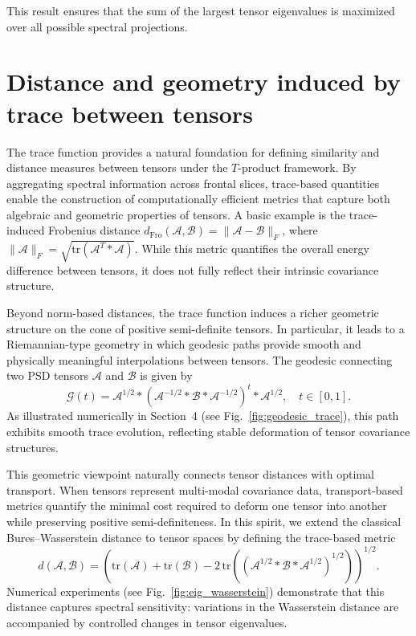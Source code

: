 \documentclass[oupthm]{CUP-JNL-BCM}%
\theoremstyle{oupplain}
\theoremstyle{oupdefinition}
\theoremstyle{oupremark}
\theoremstyle{oupproof}
\numberwithin{equation}{section}
\begin{document}
\noindent This result ensures that the sum of the largest tensor eigenvalues is maximized over all possible spectral projections.

\section{Distance and geometry induced by trace between tensors}\label{distance}

The trace function provides a natural foundation for defining similarity and distance
measures between tensors under the $T$-product framework. By aggregating spectral
information across frontal slices, trace-based quantities enable the construction of
computationally efficient metrics that capture both algebraic and geometric properties
of tensors. A basic example is the trace-induced Frobenius distance
$d_{\mathrm{Fro}}(\mathcal{A},\mathcal{B})=\|\mathcal{A}-\mathcal{B}\|_F$, where
$\|\mathcal{A}\|_F=\sqrt{\mathrm{tr}(\mathcal{A}^T * \mathcal{A})}$. While this metric
quantifies the overall energy difference between tensors, it does not fully reflect
their intrinsic covariance structure.

Beyond norm-based distances, the trace function induces a richer geometric structure
on the cone of positive semi-definite tensors. In particular, it leads to a
Riemannian-type geometry in which geodesic paths provide smooth and physically
meaningful interpolations between tensors. The geodesic connecting two PSD tensors
$\mathcal{A}$ and $\mathcal{B}$ is given by
\[
\mathcal{G}(t)
= \mathcal{A}^{1/2} *
(\mathcal{A}^{-1/2} * \mathcal{B} * \mathcal{A}^{-1/2})^{t}
* \mathcal{A}^{1/2}, \quad t \in [0,1].
\]
As illustrated numerically in Section~4 (see Fig.~\ref{fig:geodesic_trace}),
this path exhibits smooth trace evolution, reflecting stable deformation of tensor
covariance structures.

This geometric viewpoint naturally connects tensor distances with optimal transport.
When tensors represent multi-modal covariance data, transport-based metrics quantify
the minimal cost required to deform one tensor into another while preserving
positive semi-definiteness. In this spirit, we extend the classical Bures--Wasserstein
distance to tensor spaces by defining the trace-based metric
\[
d(\mathcal{A}, \mathcal{B})
=
\left(
\mathrm{tr}(\mathcal{A}) + \mathrm{tr}(\mathcal{B})
- 2\,\mathrm{tr}\!\left(
(\mathcal{A}^{1/2} * \mathcal{B} * \mathcal{A}^{1/2})^{1/2}
\right)
\right)^{1/2}.
\]
Numerical experiments (see Fig.~\ref{fig:eig_wasserstein}) demonstrate that this
distance captures spectral sensitivity: variations in the Wasserstein distance are
accompanied by controlled changes in tensor eigenvalues.
\end{document}
